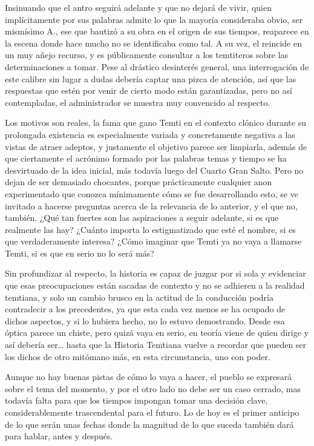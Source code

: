 \documentclass[
  spanish,
]{book}
\begin{document}
Insinuando que el antro seguirá adelante y que no dejará de vivir, quien implícitamente por sus palabras admite lo que la mayoría consideraba obvio, ser mismísimo A., ese que bautizó a su obra en el origen de sus tiempos, reaparece en la escena donde hace mucho no se identificaba como tal. A su vez, el reincide en un muy añejo recurso, y es públicamente consultar a los temtiteros sobre las determinaciones a tomar. Pese al drástico desinterés general, una interrogación de este calibre sin lugar a dudas debería captar una pizca de atención, así que las respuestas que estén por venir de cierto modo están garantizadas, pero no así contempladas, el administrador se muestra muy convencido al respecto.

Los motivos son reales, la fama que gano Temti en el contexto clónico durante su prolongada existencia es especialmente variada y concretamente negativa a las vistas de atraer adeptos, y justamente el objetivo parece ser limpiarla, además de que ciertamente el acrónimo formado por las palabras temas y tiempo se ha desvirtuado de la idea inicial, más todavía luego del Cuarto Gran Salto. Pero no dejan de ser demasiado chocantes, porque prácticamente cualquier anon experimentado que conozca mínimamente cómo se fue desarrollando esto, se ve invitado a hacerse preguntas acerca de la relevancia de lo anterior, y el que no, también. ¿Qué tan fuertes son las aspiraciones a seguir adelante, si es que realmente las hay? ¿Cuánto importa lo estigmatizado que esté el nombre, si es que verdaderamente interesa? ¿Cómo imaginar que Temti ya no vaya a llamarse Temti, si es que en serio no lo será más?

Sin profundizar al respecto, la historia es capaz de juzgar por si sola y evidenciar que esas preocupaciones están sacadas de contexto y no se adhieren a la realidad temtiana, y solo un cambio brusco en la actitud de la conducción podría contradecir a los precedentes, ya que esta cada vez menos se ha ocupado de dichos aspectos, y si lo hubiera hecho, no lo estuvo demostrando. Desde esa óptica parece un chiste, pero quizá vaya en serio, en teoría viene de quien dirige y así debería ser\ldots{} hasta que la Historia Temtiana vuelve a recordar que pueden ser los dichos de otro mitómano más, en esta circunstancia, uno con poder.

Aunque no hay buenas pistas de cómo lo vaya a hacer, el pueblo se expresará sobre el tema del momento, y por el otro lado no debe ser un caso cerrado, mas todavía falta para que los tiempos impongan tomar una decisión clave, considerablemente trascendental para el futuro. Lo de hoy es el primer anticipo de lo que serán unas fechas donde la magnitud de lo que suceda también dará para hablar, antes y después.
\end{document}
